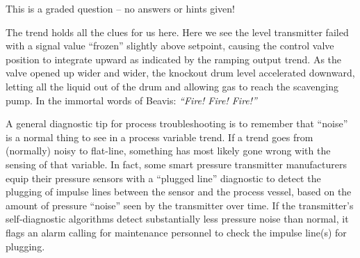 \eject






This is a graded question -- no answers or hints given!







The trend holds all the clues for us here.  Here we see the level transmitter failed with a signal value ``frozen'' slightly above setpoint, causing the control valve position to integrate upward as indicated by the ramping output trend.  As the valve opened up wider and wider, the knockout drum level accelerated downward, letting all the liquid out of the drum and allowing gas to reach the scavenging pump.  In the immortal words of Beavis: {\it ``Fire!  Fire!  Fire!''}

\vskip 10pt

A general diagnostic tip for process troubleshooting is to remember that ``noise'' is a normal thing to see in a process variable trend.  If a trend goes from (normally) noisy to flat-line, something has most likely gone wrong with the sensing of that variable.  In fact, some smart pressure transmitter manufacturers equip their pressure sensors with a ``plugged line'' diagnostic to detect the plugging of impulse lines between the sensor and the process vessel, based on the amount of pressure ``noise'' seen by the transmitter over time.  If the transmitter's self-diagnostic algorithms detect substantially less pressure noise than normal, it flags an alarm calling for maintenance personnel to check the impulse line(s) for plugging.




